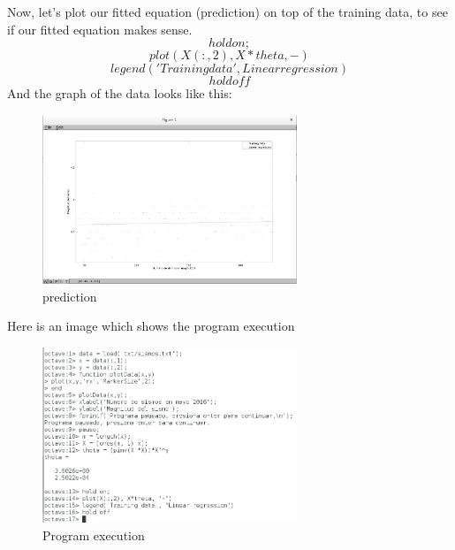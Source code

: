 \documentclass[a4paper,12pt]{article}
\begin{document}
Now, let's plot our fitted equation (prediction) on top of the training data, to see if our fitted equation makes sense.
\begin{equation}
    \label{simple_equation}
	hold on; 
\end{equation}
\begin{equation}
    \label{simple_equation}
	plot(X(:,2), X*theta, -)
\end{equation}
\begin{equation}
    \label{simple_equation}
	legend('Training data', Linear regression)
\end{equation}
\begin{equation}
    \label{simple_equation}
	hold off
\end{equation}
And the graph of the data looks like this:
\begin{figure}[H]
    \centering
    \includegraphics[width=3.0in]{img/9.png}
    \caption{prediction}
    \label{simulationfigure}
\end{figure}
Here is an image which shows the program execution
\begin{figure}[H]
    \centering
    \includegraphics[width=3.0in]{img/10.png}
    \caption{Program execution}
    \label{simulationfigure}
\end{figure}
\end{document}
